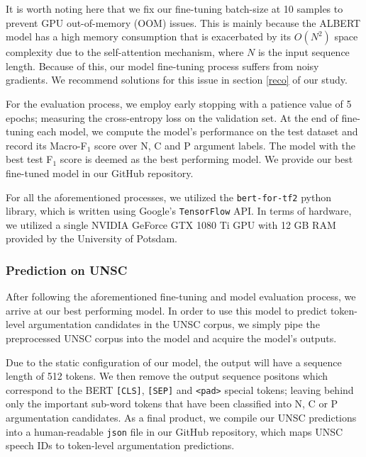 It is worth noting here that we fix our fine-tuning batch-size at 10 samples to prevent GPU out-of-memory (OOM) issues. This is mainly because the ALBERT model has a high memory consumption that is exacerbated by its $O(N^2)$ space complexity due to the self-attention mechanism, where $N$ is the input sequence length. Because of this, our model fine-tuning process suffers from noisy gradients. We recommend solutions for this issue in section \ref{reco} of our study.

For the evaluation process, we employ early stopping with a patience value of 5 epochs; measuring the cross-entropy loss on the validation set. At the end of fine-tuning each model, we compute the model's performance on the test dataset and record its Macro-F$_1$ score over N, C and P argument labels. The model with the best test F$_1$ score is deemed as the best performing model. We provide our best fine-tuned model in our GitHub repository\footnotemark[\value{footnote}].

For all the aforementioned processes, we utilized the \texttt{bert-for-tf2} python library, which is written using Google's \texttt{TensorFlow} API. In terms of hardware, we utilized a single NVIDIA GeForce GTX 1080 Ti GPU with 12 GB RAM provided by the University of Potsdam.

\subsubsection{Prediction on UNSC}

After following the aforementioned fine-tuning and model evaluation process, we arrive at our best performing model. In order to use this model to predict token-level argumentation candidates in the UNSC corpus, we simply pipe the preprocessed UNSC corpus into the model and acquire the model's outputs.

Due to the static configuration of our model, the output will have a sequence length of 512 tokens. We then remove the output sequence positons which correspond to the BERT \texttt{[CLS]}, \texttt{[SEP]} and \texttt{<pad>} special tokens; leaving behind only the important sub-word tokens that have been classified into N, C or P argumentation candidates. As a final product, we compile our UNSC predictions into a human-readable \texttt{json} file in our GitHub repository\footnotemark[\value{footnote}], which maps UNSC speech IDs to token-level argumentation predictions.